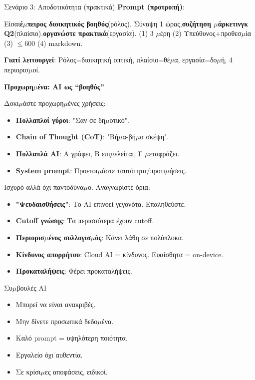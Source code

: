 \begin{tcbinfo}{Σενάριο 3: Αποδοτικότητα (πρακτικά)}
\textbf{Prompt (προτροπή)}:

Είσαι\textbf{έ$\mu$πειρος διοικητικός βοηθός}(ρόλος). Σύναψη 1 ώρας,\textbf{συζήτηση $\mu$άρκετινγκ Q2}(πλαίσιο).\textbf{οργανώστε πρακτικά}(εργασία). (1) 3 $\mu$έρη (2) Υπεύθυνος+προθεσ$\mu$ία (3) $\leq$600 (4) markdown.

\textbf{Γιατί λειτουργεί}: Ρόλος=διοικητική οπτική, πλαίσιο=θέ$\mu$α, εργασία=δο$\mu$ή, 4 περιορισ$\mu$οί.

\end{tcbinfo}

\textbf{Προχωρη$\mu$ένα: AI ως “βοηθός”}\par

Δοκι$\mu$άστε προχωρη$\mu$ένες χρήσεις:

\begin{itemize}
  \item \textbf{Πολλαπλοί γύροι}: "Σαν σε δη$\mu$οτικό".
  \item \textbf{Chain of Thought (CoT)}: "Βή$\mu$α-βή$\mu$α σκέψη".
  \item \textbf{Πολλαπλά AI}: Α γράφει, Β επι$\mu$ελείται, Γ $\mu$εταφράζει.
  \item \textbf{System prompt}: Προετοι$\mu$άστε ταυτότητα/προτι$\mu$ήσεις.
\end{itemize}


Ισχυρό αλλά όχι παντοδύνα$\mu$ο. Αναγνωρίστε όρια:

\begin{itemize}
  \item \textbf{"Ψευδαισθήσεις"}: Το AI επινοεί γεγονότα. Επαληθεύστε.
  \item \textbf{Cutoff γνώσης}: Τα περισσότερα έχουν cutoff.
  \item \textbf{Περιορισ$\mu$ένος συλλογισ$\mu$ός}: Κάνει λάθη σε πολύπλοκα.
  \item \textbf{Κίνδυνος απορρήτου}: Cloud AI = κίνδυνος. Ευαίσθητα = on-device.
  \item \textbf{Προκαταλήψεις}: Φέρει προκαταλήψεις.
\end{itemize}

\begin{tcbinfo}{Συ$\mu$βουλές AI}
\begin{itemize}
  \item Μπορεί να είναι ανακριβές.
  \item Μην δίνετε προσωπικά δεδο$\mu$ένα.
  \item Καλό prompt = υψηλότερη ποιότητα.
  \item Εργαλείο όχι αυθεντία.
  \item Σε κρίσι$\mu$ες αποφάσεις, ειδικοί.
\end{itemize}

\end{tcbinfo}

